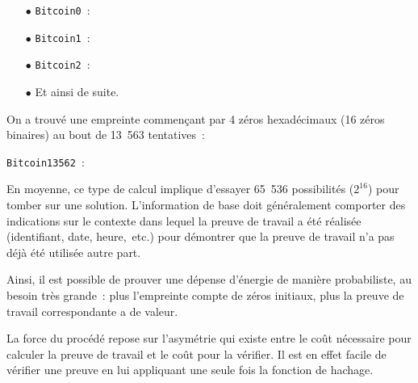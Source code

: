 \begin{itemize}
\item[$\bullet$] \texttt{Bitcoin0}~: 
\item[$\bullet$] \texttt{Bitcoin1}~: 
\item[$\bullet$] \texttt{Bitcoin2}~: 
\item[$\bullet$] Et ainsi de suite.
\end{itemize}


On a trouvé une empreinte commençant par 4 zéros hexadécimaux (16 zéros binaires) au bout de 13~563 tentatives~:

\texttt{Bitcoin13562}~:  

En moyenne, ce type de calcul implique d'essayer 65~536 possibilités ($2^{16}$) pour tomber sur une solution. L'information de base doit généralement comporter des indications sur le contexte dans lequel la preuve de travail a été réalisée (identifiant, date, heure,~etc.) pour démontrer que la preuve de travail n'a pas déjà été utilisée autre part.

Ainsi, il est possible de prouver une dépense d'énergie de manière probabiliste, au besoin très grande~: plus l'empreinte compte de zéros initiaux, plus la preuve de travail correspondante a de valeur.

La force du procédé repose sur l'asymétrie qui existe entre le coût nécessaire pour calculer la preuve de travail et le coût pour la vérifier. Il est en effet facile de vérifier une preuve en lui appliquant une seule fois la fonction de hachage.

